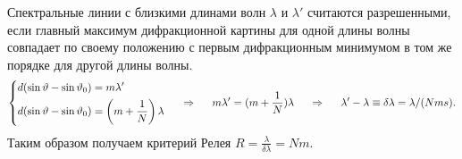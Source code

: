 Спектральные линии с близкими длинами волн $\lambda$ и $\lambda'$ считаются разрешенными, если главный максимум дифракционной 
картины для одной длины волны совпадает по своему положению с первым дифракционным минимумом в том же порядке для другой длины волны. 
\begin{equation*}
	\left\{
	\begin{aligned}
		&d (\sin \vartheta - \sin \vartheta_0) =  m \lambda'\\
		&d (\sin \vartheta - \sin \vartheta_0) = \left(m+\frac{1}{N}\right) \lambda	
	\end{aligned}
	\right.
	\hspace{0.5 cm}
	\Rightarrow
	\hspace{0.5 cm}
	m \lambda' = (m+\frac{1}{N}) \lambda
	\hspace{0.5 cm}
	\Rightarrow
	\hspace{0.5 cm}
	\lambda' - \lambda \equiv \delta \lambda = \lambda/(N ms).
\end{equation*}
Таким образом получаем критерий Релея $R = \frac{\lambda}{\delta\lambda} = N m$.
